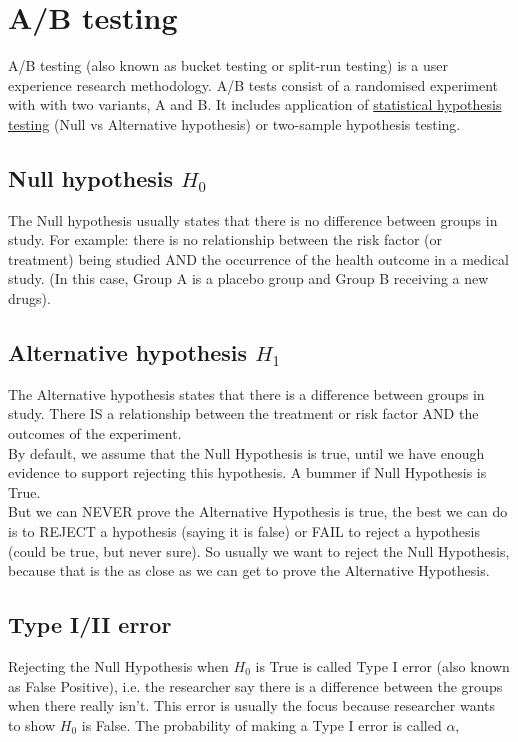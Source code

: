 \section{A/B testing}
\label{abtest}

A/B testing (also known as bucket testing or split-run testing) is a user experience research methodology. A/B tests consist of a randomised experiment with with two variants, A and B. It includes application of \underline{statistical hypothesis testing} (Null vs Alternative hypothesis) or two-sample hypothesis testing. \\


\subsection{Null hypothesis $H_0$}

The Null hypothesis usually states that there is no difference between groups in study. For example: there is no relationship between the risk factor (or treatment) being studied AND the occurrence of the health outcome in a medical study. (In this case, Group A is a placebo group and Group B receiving a new drugs).

\subsection{Alternative hypothesis $H_1$}

The Alternative hypothesis states that there is a difference between groups in study. There IS a relationship between the treatment or risk factor AND the outcomes of the experiment.\\

By default, we assume that the Null Hypothesis is true, until we have enough evidence to support rejecting this hypothesis. A bummer if Null Hypothesis is True. \\

But we can NEVER prove the Alternative Hypothesis is true, the best we can do is to REJECT a hypothesis (saying it is false) or FAIL to reject a hypothesis (could be true, but never sure). So usually we want to reject the Null Hypothesis, because that is the as close as we can get to prove the Alternative Hypothesis.

\subsection{Type I/II error}

Rejecting the Null Hypothesis when $H_0$ is True is called Type I error (also known as False Positive), i.e. the researcher say there is a difference between the groups when there really isn't. This error is usually the focus because researcher wants to show $H_0$ is False. The probability of making a Type I error is called $\alpha$, 

